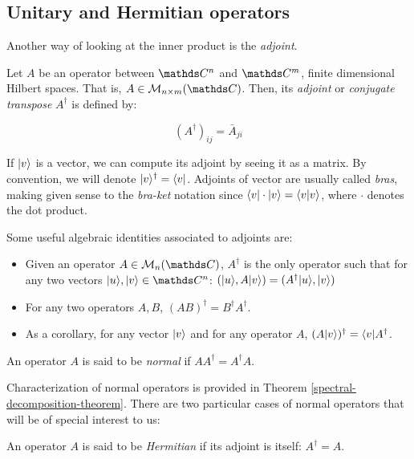 \subsection{Unitary and Hermitian operators}


Another way of looking at the inner product is the \emph{adjoint}.

\begin{definition}
	Let $A$ be an operator between $\C^n$ and $\C^m$, finite dimensional Hilbert spaces. That is, $A \in \mathcal{M}_{n{\times}m}(\C)$. Then, its \emph{adjoint} or \emph{conjugate transpose} $A^\dagger$ is defined by:
	
	$$ (A^\dagger)_{ij} = \bar A_{ji} $$
\end{definition}

If $|v\rangle$ is a vector, we can compute its adjoint by seeing it as a matrix. By convention, we will denote $|v\rangle^\dagger = \langle v|$. Adjoints of vector are usually called \emph{bras}, making given sense to the \emph{bra-ket} notation since $\langle v| \cdot |v\rangle = \langle v|v\rangle$, where $\cdot$ denotes the dot product.

Some useful algebraic identities associated to adjoints are:

\begin{itemize}
	\item Given an operator $A \in \mathcal{M}_{n}(\C)$, $A^\dagger$ is the only operator such that for any two vectors $|u\ra, |v\ra \in \C^n$: $( |u\rangle, A|v\rangle) = ( A^\dagger |u\rangle, |v\rangle)$
	\item For any two operators $A,B$, $(AB)^\dagger = B^\dagger A^\dagger$.
	\item As a corollary, for any vector $|v\rangle$ and for any operator $A$, $(A|v\rangle)^\dagger = \langle v|A^\dagger$.
\end{itemize}

\begin{definition}
	An operator $A$ is said to be \emph{normal} if $AA^\dagger = A^\dagger A$.
\end{definition}

Characterization of normal operators is provided in Theorem \ref{spectral-decomposition-theorem}. There are two particular cases of normal operators that will be of special interest to us:

\begin{definition}
	An operator $A$ is said to be \emph{Hermitian} if its adjoint is itself: $A^\dagger = A$.
\end{definition}


